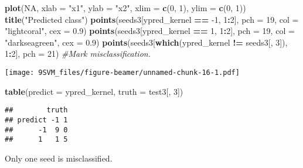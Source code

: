\documentclass[10pt,ignorenonframetext,]{beamer}
\newenvironment{Shaded}{\begin{snugshade}}{\end{snugshade}}
\newcommand{\KeywordTok}[1]{\textcolor[rgb]{0.13,0.29,0.53}{\textbf{#1}}}
\newcommand{\DataTypeTok}[1]{\textcolor[rgb]{0.13,0.29,0.53}{#1}}
\newcommand{\DecValTok}[1]{\textcolor[rgb]{0.00,0.00,0.81}{#1}}
\newcommand{\FloatTok}[1]{\textcolor[rgb]{0.00,0.00,0.81}{#1}}
\newcommand{\StringTok}[1]{\textcolor[rgb]{0.31,0.60,0.02}{#1}}
\newcommand{\CommentTok}[1]{\textcolor[rgb]{0.56,0.35,0.01}{\textit{#1}}}
\newcommand{\OtherTok}[1]{\textcolor[rgb]{0.56,0.35,0.01}{#1}}
\newcommand{\OperatorTok}[1]{\textcolor[rgb]{0.81,0.36,0.00}{\textbf{#1}}}
\newcommand{\NormalTok}[1]{#1}
\begin{document}
\begin{frame}[fragile]

\begin{Shaded}
\begin{Highlighting}[]
\KeywordTok{plot}\NormalTok{(}\OtherTok{NA}\NormalTok{, }\DataTypeTok{xlab =} \StringTok{"x1"}\NormalTok{, }\DataTypeTok{ylab =} \StringTok{"x2"}\NormalTok{, }\DataTypeTok{xlim =} \KeywordTok{c}\NormalTok{(}\DecValTok{0}\NormalTok{, }\DecValTok{1}\NormalTok{), }\DataTypeTok{ylim =} \KeywordTok{c}\NormalTok{(}\DecValTok{0}\NormalTok{, }\DecValTok{1}\NormalTok{))}
\KeywordTok{title}\NormalTok{(}\StringTok{"Predicted class"}\NormalTok{)}
\KeywordTok{points}\NormalTok{(seeds3[ypred_kernel }\OperatorTok{==}\StringTok{ }\DecValTok{-1}\NormalTok{, }\DecValTok{1}\OperatorTok{:}\DecValTok{2}\NormalTok{], }\DataTypeTok{pch =} \DecValTok{19}\NormalTok{, }\DataTypeTok{col =} \StringTok{"lightcoral"}\NormalTok{, }
    \DataTypeTok{cex =} \FloatTok{0.9}\NormalTok{)}
\KeywordTok{points}\NormalTok{(seeds3[ypred_kernel }\OperatorTok{==}\StringTok{ }\DecValTok{1}\NormalTok{, }\DecValTok{1}\OperatorTok{:}\DecValTok{2}\NormalTok{], }\DataTypeTok{pch =} \DecValTok{19}\NormalTok{, }\DataTypeTok{col =} \StringTok{"darkseagreen"}\NormalTok{, }
    \DataTypeTok{cex =} \FloatTok{0.9}\NormalTok{)}
\KeywordTok{points}\NormalTok{(seeds3[}\KeywordTok{which}\NormalTok{(ypred_kernel }\OperatorTok{!=}\StringTok{ }\NormalTok{seeds3[, }\DecValTok{3}\NormalTok{]), }\DecValTok{1}\OperatorTok{:}\DecValTok{2}\NormalTok{], }\DataTypeTok{pch =} \DecValTok{21}\NormalTok{)  }\CommentTok{#Mark misclassification.}
\end{Highlighting}
\end{Shaded}

\texttt{[image: 9SVM\_files/figure-beamer/unnamed-chunk-16-1.pdf]}

\begin{Shaded}
\begin{Highlighting}[]
\KeywordTok{table}\NormalTok{(}\DataTypeTok{predict =}\NormalTok{ ypred_kernel, }\DataTypeTok{truth =}\NormalTok{ test3[, }\DecValTok{3}\NormalTok{])}
\end{Highlighting}
\end{Shaded}

\begin{verbatim}
##        truth
## predict -1 1
##      -1  9 0
##      1   1 5
\end{verbatim}

Only one seed is misclassified.

\end{frame}
\end{document}
